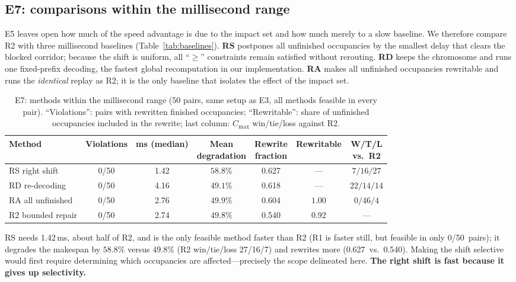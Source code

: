\documentclass[manuscript,screen,review]{acmart}
\newcommand{\NPairs}{50}
\newcommand{\FeasRone}{0/\NPairs}            %
\newcommand{\ClosureAliveFrac}{92\%}
\newcommand{\MsShift}{1.42}          %
\newcommand{\MsRedecode}{4.16}       %
\newcommand{\MsAllFuture}{2.76}      %
\newcommand{\MsCheapRtwo}{2.74}      %
\newcommand{\ShiftBad}{0/\NPairs}    %
\newcommand{\RedecodeBad}{0/\NPairs}
\newcommand{\WinVsShift}{27/16/7}    %
\newcommand{\ResFracCheapRtwo}{0.540}
\newcommand{\ResFracShift}{0.627}
\newcommand{\ResFracRedecode}{0.618}
\newcommand{\ResFracAllFuture}{0.604}
\newcommand{\ClosureShareMean}{0.92} %
\begin{document}
\subsection{E7: comparisons within the millisecond range}
\label{sec:cheap}

E5 leaves open how much of the speed advantage is due to the impact set and how much merely to a slow baseline. We therefore compare R2 with three millisecond baselines (Table~\ref{tab:baselines}).
\textbf{RS} postpones all unfinished occupancies by the smallest delay that clears the blocked corridor; because the shift is uniform, all ``\(\ge\)'' constraints remain satisfied without rerouting.
\textbf{RD} keeps the chromosome and runs one fixed-prefix decoding, the fastest global recomputation in our implementation.
\textbf{RA} makes all unfinished occupancies rewritable and runs the \emph{identical} replay as R2; it is the only baseline that isolates the effect of the impact set.

\begin{table}[t]
\centering
\caption{E7: methods within the millisecond range (\(\NPairs\) pairs, same setup as E3, all methods feasible in every pair).
``Violations'': pairs with rewritten finished occupancies; ``Rewritable'': share of unfinished occupancies included in the rewrite; last column: \(C_{\max}\) win/tie/loss against R2.}
\label{tab:cheap}
\small
\begin{tabular}{@{}lcccccc@{}}
\toprule
Method & Violations & ms (median) & \makecell{Mean\\degradation} & \makecell{Rewrite\\fraction} & Rewritable & \makecell{W/T/L\\vs.\ R2} \\
\midrule
RS right shift & \ShiftBad     & \MsShift    & \(58.8\%\) & \ResFracShift    & ---   & \(7/16/27\) \\
RD re-decoding & \RedecodeBad  & \MsRedecode & \(49.1\%\) & \ResFracRedecode & ---   & \(22/14/14\) \\
RA all unfinished & \ShiftBad  & \MsAllFuture & \(49.9\%\) & \ResFracAllFuture & \(1.00\) & \(0/46/4\) \\
R2 bounded repair & \ShiftBad  & \MsCheapRtwo & \(49.8\%\) & \ResFracCheapRtwo & \ClosureShareMean & --- \\
\bottomrule
\end{tabular}
\end{table}

RS needs \MsShift\,ms, about half of R2, and is the only feasible method faster than R2 (R1 is faster still, but feasible in only \FeasRone\ pairs);
it degrades the makespan by \(58.8\%\) versus \(49.8\%\) (R2 win/tie/loss \WinVsShift) and rewrites more (\ResFracShift\ vs.\ \ResFracCheapRtwo).
Making the shift selective would first require determining which occupancies are affected---precisely the scope delineated here. \textbf{The right shift is fast because it gives up selectivity.}
\end{document}
